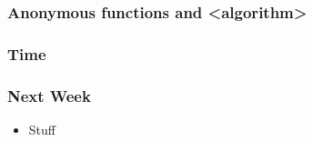 \documentclass[glossy]{beamer}
\begin{document}
\begin{frame}[fragile=singleslide]
  \frametitle{Anonymous functions and <algorithm>}
  \begin{cppcode}
  \end{cppcode}
\end{frame}

\begin{frame}[fragile=singleslide]
  \frametitle{Time}
  \begin{cppcode}
  \end{cppcode}
\end{frame}

\begin{frame}[fragile=singleslide]
  \frametitle{Next Week}
  \begin{itemize}
    \item Stuff
  \end{itemize}
\end{frame}
\end{document}
